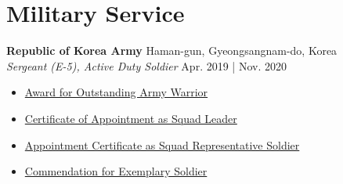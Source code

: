 \documentclass[a4paper,9pt]{extarticle}
\begin{document}
\section*{Military Service}
\noindent
\textbf{Republic of Korea Army} \hfill Haman-gun, Gyeongsangnam-do, Korea \\
\textit{Sergeant (E-5), Active Duty Soldier} \hfill Apr. 2019 | Nov. 2020
\begin{itemize}
    \item \href{https://github.com/user-attachments/assets/584d8f84-5bbe-4a71-9ae3-bda5ce40bd6f}{Award for Outstanding Army Warrior}  
    \item \href{https://github.com/user-attachments/assets/d3b82b44-dff0-4d58-a944-747f46f8a50e}{Certificate of Appointment as Squad Leader}
    \item \href{https://github.com/user-attachments/assets/8565647d-3609-4866-8e18-fbdf9a9e227c}{Appointment Certificate as Squad Representative Soldier}
    \item \href{https://github.com/user-attachments/assets/f4f76912-92a7-440e-b8a2-4ce52b1ec39a}{Commendation for Exemplary Soldier}
\end{itemize}




\end{document}
